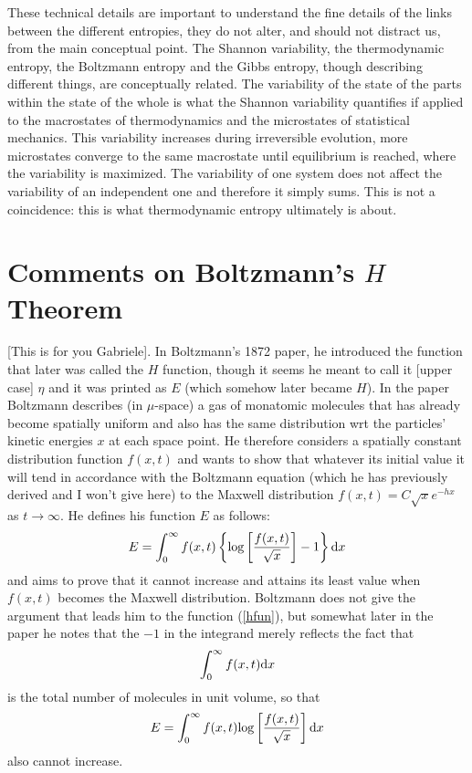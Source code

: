 \documentclass{article}
\begin{document}
These technical details are important to understand the fine details of the links between the different entropies, they do not alter, and should not distract us, from the main conceptual point. The Shannon variability, the thermodynamic entropy, the Boltzmann entropy and the Gibbs entropy, though describing different things, are conceptually related. The variability of the state of the parts within the state of the whole is what the Shannon variability quantifies if applied to the macrostates of thermodynamics and the microstates of statistical mechanics. This variability increases during irreversible evolution, more microstates converge to the same macrostate until equilibrium is reached, where the variability is maximized. The variability of one system does not affect the variability of an independent one and therefore it simply sums. This is not a coincidence: this is what thermodynamic entropy ultimately is about.

\section{Comments on Boltzmann's $H$ Theorem}

[This is for you Gabriele]. In Boltzmann's 1872 paper, he introduced the function that later was called the $H$ function, though it seems he meant to call it [upper case] $\eta$ and it was printed as $E$ (which somehow later became $H$). In the paper Boltzmann describes (in $\mu$-space) a gas of monatomic molecules that has already become spatially uniform and also has the same distribution wrt the particles' kinetic energies $x$ at each space point. He therefore considers a spatially constant distribution function $f(x,t)$ and wants to show that whatever its initial value it will tend in accordance with the Boltzmann equation (which he has previously derived and I won't give here) to the Maxwell distribution $f(x,t)=C\sqrt xe^{-hx}$ as $t\rightarrow\infty$. He defines his function $E$ as follows:
\begin{equation}
E=\int_0^\infty f(x,t)\left\{\textrm{log}\left [{f(x,t)\over \sqrt x}\right ]-1\right\}\textrm dx\label{hfun}
\end{equation}
and aims to prove that it cannot increase and attains its least value when $f(x,t)$ becomes the Maxwell distribution. Boltzmann does not give the argument that leads him to the function (\ref{hfun}), but somewhat later in the paper he notes that the $-1$ in the integrand merely reflects the fact that
$$
\int_0^\infty f(x,t)\textrm dx
$$
is the total number of molecules in unit volume, so that 
\begin{equation}
E=\int_0^\infty f(x,t)\textrm{log}\left [{f(x,t)\over \sqrt x}\right ]\textrm dx\label{hfunb}
\end{equation}
also cannot increase.
\end{document}

